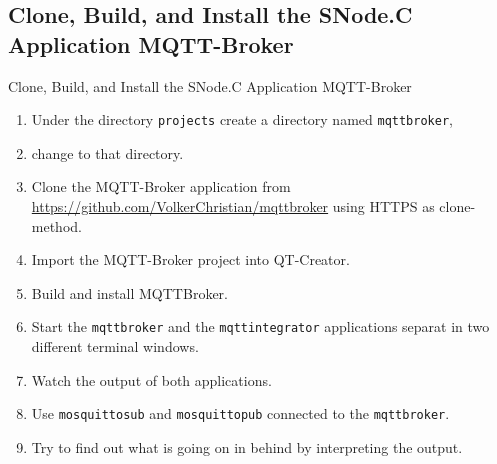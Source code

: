 \subsection{Clone, Build, and Install the SNode.C Application MQTT-Broker}

\begin{frame}{Clone, Build, and Install the SNode.C Application MQTT-Broker}
  \begin{enumerate}
    \item Under the directory \lstinline|projects| create a directory named \lstinline|mqttbroker|,
    \item change to that directory.
    \item Clone the MQTT-Broker application from \textcolor{fh-ooe-red}{\href{https://github.com/VolkerChristian/mqttbroker}{https://github.com/VolkerChristian/mqttbroker}} using \textcolor{fh-ooe-red}{HTTPS} as clone-method.
    \item Import the MQTT-Broker project into QT-Creator.
    \item Build and install MQTTBroker.
    \item Start the \texttt{\textcolor{fh-ooe-red}{mqttbroker}} and the \texttt{\textcolor{fh-ooe-red}{mqttintegrator}} applications separat in two different terminal windows.
    \item Watch the output of both applications.
    \item Use \texttt{\textcolor{fh-ooe-red}{mosquitto\textunderscore{}sub}} and  \texttt{\textcolor{fh-ooe-red}{mosquitto\textunderscore{}pub}} connected to the \texttt{\textcolor{fh-ooe-red}{mqttbroker}}.
    \item Try to find out what is going on in behind by interpreting the output.
  \end{enumerate}
\end{frame}
